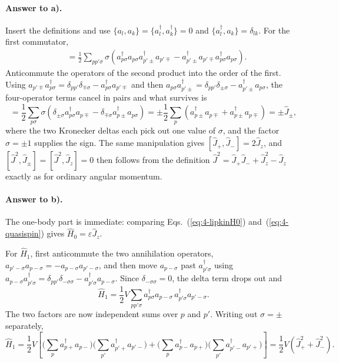 \paragraph{Answer to a).}
Insert the definitions and use
$\{a_l,a_k\}=\{a^{\dagger}_l,a^{\dagger}_k\}=0$ and
$\{a^{\dagger}_l,a_k\}=\delta_{lk}$.  For the first commutator,
\begin{align}
  [\hat{J}_z,\hat{J}_{\pm}]
  &= \frac{1}{2}\sum_{pp'\sigma}\sigma\left(
     a_{p\sigma}^{\dagger}a_{p\sigma}a_{p'\pm}^{\dagger}a_{p'\mp}
   - a_{p'\pm}^{\dagger}a_{p'\mp}a_{p\sigma}^{\dagger}a_{p\sigma}\right).
  \label{eq:4-exa1}
\end{align}
Anticommute the operators of the second product into the order of the first.
Using $a_{p'\mp}a_{p\sigma}^{\dagger}=\delta_{pp'}\delta_{\mp\sigma}
- a_{p\sigma}^{\dagger}a_{p'\mp}$ and then
$a_{p\sigma}a_{p'\pm}^{\dagger}=\delta_{pp'}\delta_{\pm\sigma}
- a_{p'\pm}^{\dagger}a_{p\sigma}$, the four-operator terms cancel in pairs and
what survives is
\begin{equation}
  [\hat{J}_z,\hat{J}_{\pm}]
  = \frac{1}{2}\sum_{p\sigma}\sigma\left(
     \delta_{\pm\sigma}a_{p\sigma}^{\dagger}a_{p\mp}
   - \delta_{\mp\sigma}a_{p\pm}^{\dagger}a_{p\sigma}\right)
  = \pm\frac{1}{2}\sum_p\left(
     a_{p\pm}^{\dagger}a_{p\mp} + a_{p\pm}^{\dagger}a_{p\mp}\right)
  = \pm\hat{J}_{\pm},
  \label{eq:4-exa2}
\end{equation}
where the two Kronecker deltas each pick out one value of $\sigma$, and the
factor $\sigma=\pm1$ supplies the sign.  The same manipulation gives
$[\hat{J}_+,\hat{J}_-]=2\hat{J}_z$, and $[\hat{J}^2,\hat{J}_{\pm}]=
[\hat{J}^2,\hat{J}_z]=0$ then follows from the definition
$\hat{J}^2=\hat{J}_+\hat{J}_-+\hat{J}_z^2-\hat{J}_z$ exactly as for ordinary
angular momentum.

\paragraph{Answer to b).}
The one-body part is immediate: comparing
Eqs.~(\ref{eq:4-lipkinH0}) and~(\ref{eq:4-quasispin}) gives
$\hat{H}_0=\varepsilon\hat{J}_z$.

For $\hat{H}_1$, first anticommute the two annihilation operators,
$a_{p'-\sigma}a_{p-\sigma}=-a_{p-\sigma}a_{p'-\sigma}$, and then move
$a_{p-\sigma}$ past $a_{p'\sigma}^{\dagger}$ using
$a_{p-\sigma}a_{p'\sigma}^{\dagger}
=\delta_{pp'}\delta_{-\sigma\sigma}-a_{p'\sigma}^{\dagger}a_{p-\sigma}$.
Since $\delta_{-\sigma\sigma}=0$, the delta term drops out and
\begin{equation}
  \hat{H}_1 = \frac{1}{2}V\sum_{pp'\sigma}
    a_{p\sigma}^{\dagger}a_{p-\sigma}\,
    a_{p'\sigma}^{\dagger}a_{p'-\sigma} .
  \label{eq:4-exb1}
\end{equation}
The two factors are now independent sums over $p$ and $p'$.  Writing out
$\sigma=\pm$ separately,
\begin{equation}
  \hat{H}_1 = \frac{1}{2}V\left[
    \Big(\sum_p a_{p+}^{\dagger}a_{p-}\Big)
    \Big(\sum_{p'}a_{p'+}^{\dagger}a_{p'-}\Big)
  + \Big(\sum_p a_{p-}^{\dagger}a_{p+}\Big)
    \Big(\sum_{p'}a_{p'-}^{\dagger}a_{p'+}\Big)\right]
  = \frac{1}{2}V\left(\hat{J}_+^2+\hat{J}_-^2\right).
  \label{eq:4-exb2}
\end{equation}

